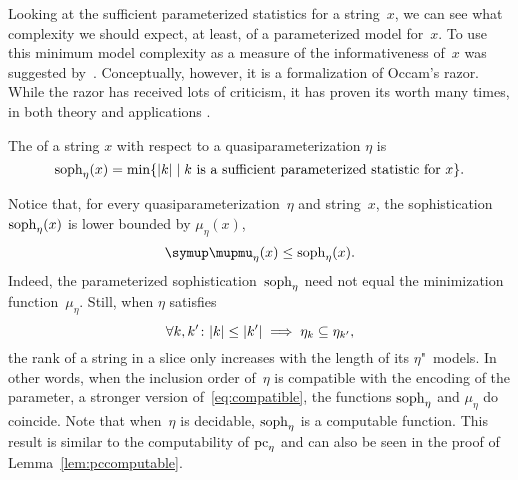 Looking at the sufficient parameterized statistics for a string~$x$, we can see what complexity we should expect, at least, of a parameterized model for~$x$.
To use this minimum model complexity as a measure of the informativeness of~$x$ was suggested by~\textcite{koppel1988structure}.
Conceptually, however, it is a formalization of Occam's razor.
While the razor has received lots of criticism, it has proven its worth many times, in both theory and applications \parencite{grunwald2007minimum}.
\begin{definition}
  The  of a string $x$ with respect to a quasiparameterization $\eta$ is
  \begin{equation*}
    \operatorname{soph}_\eta(x) = \min\{{\lvert k\rvert} \;|\; \text{$k$ is a sufficient parameterized statistic for $x$}\}.
  \end{equation*}
\end{definition}

Notice that, for every quasiparameterization~$\eta$ and string~$x$, the sophistication $\operatorname{soph}_\eta(x)$ is lower bounded by $\mu_\eta(x)$,
\begin{equation*}
  \mu_\eta(x) \le \soph_\eta(x).
\end{equation*}
Indeed, the parameterized sophistication~$\operatorname{soph}_\eta$ need not equal the minimization function~$\mu_\eta$.
Still, when $\eta$ satisfies
\begin{equation}
\label{eq:compatible_strong}
  \forall k, k'\colon {\lvert k\rvert} \le {\lvert k'\rvert} \implies \eta_k \subseteq \eta_{k'},
\end{equation}
the rank of a string in a slice only increases with the length of its $\eta$"~models.
In other words, when the inclusion order of~$\eta$ is compatible with the encoding of the parameter, a stronger version of~\eqref{eq:compatible}, the functions $\operatorname{soph}_\eta$ and $\mu_\eta$ do coincide.
Note that when~$\eta$ is decidable, $\operatorname{soph}_\eta$ is a computable function.
This result is similar to the computability of $\operatorname{pc}_\eta$ and can also be seen in the proof of Lemma~\ref{lem:pccomputable}.

